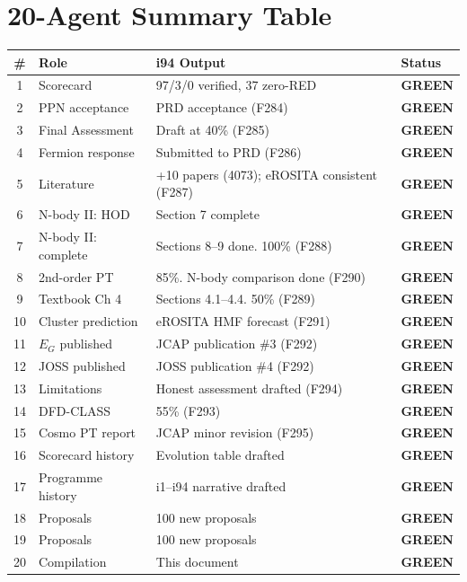 \documentclass[11pt,a4paper]{article}
\newcommand{\GREEN}{\textcolor{dfdgreen}{\textbf{GREEN}}}
\begin{document}
\section{20-Agent Summary Table}

\begin{center}
\begin{longtable}{clp{7cm}l}
\toprule
\textbf{\#} & \textbf{Role} & \textbf{i94 Output} & \textbf{Status} \\
\midrule
\endhead
1 & Scorecard & 97/3/0 verified, 37 zero-RED & \GREEN \\
2 & PPN acceptance & PRD acceptance (F284) & \GREEN \\
3 & Final Assessment & Draft at 40\% (F285) & \GREEN \\
4 & Fermion response & Submitted to PRD (F286) & \GREEN \\
5 & Literature & +10 papers (4073); eROSITA consistent (F287) & \GREEN \\
6 & N-body II: HOD & Section 7 complete & \GREEN \\
7 & N-body II: complete & Sections 8--9 done. 100\% (F288) & \GREEN \\
8 & 2nd-order PT & 85\%. N-body comparison done (F290) & \GREEN \\
9 & Textbook Ch 4 & Sections 4.1--4.4. 50\% (F289) & \GREEN \\
10 & Cluster prediction & eROSITA HMF forecast (F291) & \GREEN \\
11 & $E_G$ published & JCAP publication \#3 (F292) & \GREEN \\
12 & JOSS published & JOSS publication \#4 (F292) & \GREEN \\
13 & Limitations & Honest assessment drafted (F294) & \GREEN \\
14 & DFD-CLASS & 55\% (F293) & \GREEN \\
15 & Cosmo PT report & JCAP minor revision (F295) & \GREEN \\
16 & Scorecard history & Evolution table drafted & \GREEN \\
17 & Programme history & i1--i94 narrative drafted & \GREEN \\
18 & Proposals & 100 new proposals & \GREEN \\
19 & Proposals & 100 new proposals & \GREEN \\
20 & Compilation & This document & \GREEN \\
\bottomrule
\end{longtable}
\end{center}
\end{document}
